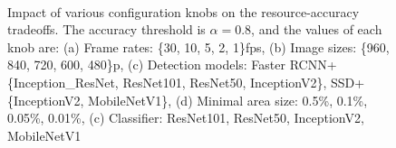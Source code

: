 \begin{figure}
    \centering
    \hspace{-0.5cm}
    \hspace{-0.7cm}
    \hspace{-0.7cm}
    \\
    \hspace{-0.7cm}
    \caption{Impact of various configuration knobs on the resource-accuracy tradeoffs. The accuracy threshold is $\alpha=0.8$, and the values of each knob are:
    (a) Frame rates: \{30, 10, 5, 2, 1\}fps, 
    (b) Image sizes: \{960, 840, 720, 600, 480\}p, 
    (c) Detection models: Faster RCNN+\{Inception\_ResNet, ResNet101, ResNet50, InceptionV2\}, SSD+\{InceptionV2, MobileNetV1\},
    (d) Minimal area size: 0.5\%, 0.1\%, 0.05\%, 0.01\%,
    (c) Classifier: ResNet101, ResNet50, InceptionV2, MobileNetV1}
    \label{fig:impact-of-configs}
\end{figure}



